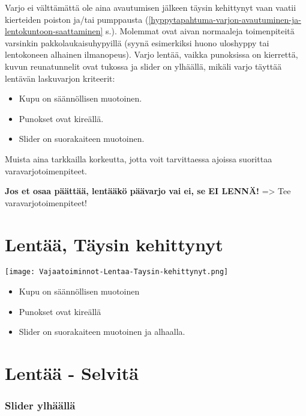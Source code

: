 
Varjo ei välttämättä ole aina avautumisen jälkeen täysin kehittynyt vaan vaatii kierteiden poiston ja/tai pumppausta (\ref{hyppytapahtuma-varjon-avautuminen-ja-lentokuntoon-saattaminen} s.\pageref{hyppytapahtuma-varjon-avautuminen-ja-lentokuntoon-saattaminen}). Molemmat ovat aivan normaaleja toimenpiteitä varsinkin pakkolaukaisuhypyillä (syynä esimerkiksi huono uloshyppy tai lentokoneen alhainen ilmanopeus). Varjo lentää, vaikka punoksissa on kierrettä, kuvun reunatunnelit ovat tukossa ja slider on ylhäällä, mikäli varjo täyttää lentävän laskuvarjon kriteerit: 

\begin{framed}
\begin{itemize}
\item  Kupu on säännöllisen muotoinen. 
\item  Punokset ovat kireällä. 
\item  Slider on suorakaiteen muotoinen. 
\end{itemize}
\end{framed}

Muista aina tarkkailla korkeutta, jotta voit tarvittaessa ajoissa suorittaa varavarjotoimenpiteet. 


\textbf{Jos et osaa päättää, lentääkö päävarjo vai ei, se EI LENNÄ!} => Tee varavarjotoimenpiteet! 

\section{ Lentää, Täysin kehittynyt }
\label{paavarjon-vajaatoiminnot-lentaa-taysin-kehittynyt}


\begin{Figure}\centering\texttt{[image: Vajaatoiminnot-Lentaa-Taysin-kehittynyt.png]}\end{Figure} 

\begin{itemize}
\item  Kupu on säännöllisen muotoinen 
\item  Punokset ovat kireällä 
\item  Slider on suorakaiteen muotoinen ja alhaalla. 
\end{itemize}

\section{ Lentää - Selvitä }
\label{paavarjon-vajaatoiminnot-lentaa-selvita}

\subsubsection{Slider ylhäällä}
\label{paavarjon-vajaatoiminnot-slider-ylhaalla}



